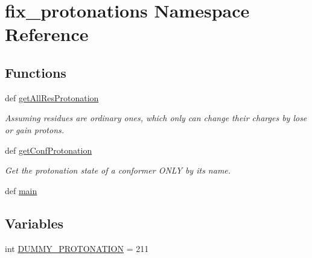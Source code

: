 \hypertarget{namespacefix__protonations}{\section{fix\-\_\-protonations Namespace Reference}
\label{namespacefix__protonations}
}
\subsection*{Functions}
\begin{DoxyCompactItemize}
\item 
def \hyperlink{namespacefix__protonations_a6c9eb3cd089468205d12e9b564ae5a66}{get\-All\-Res\-Protonation}
\begin{DoxyCompactList}\small\item\em Assuming residues are ordinary ones, which only can change their charges by lose or gain protons. \end{DoxyCompactList}\item 
def \hyperlink{namespacefix__protonations_a9b09639663427e3972a71b6a1bf150ac}{get\-Conf\-Protonation}
\begin{DoxyCompactList}\small\item\em Get the protonation state of a conformer O\-N\-L\-Y by its name. \end{DoxyCompactList}\item 
def \hyperlink{namespacefix__protonations_a1f61d55452e5bb8cef4ce17636b7743c}{main}
\end{DoxyCompactItemize}
\subsection*{Variables}
\begin{DoxyCompactItemize}
\item 
int \hyperlink{namespacefix__protonations_a4a7698bcea89adba5f4b9a4cbc3ca6d5}{D\-U\-M\-M\-Y\-\_\-\-P\-R\-O\-T\-O\-N\-A\-T\-I\-O\-N} = 211
\end{DoxyCompactItemize}


